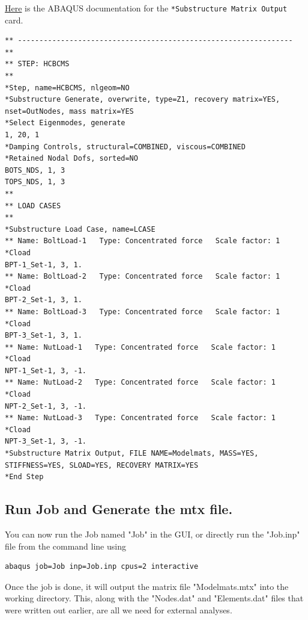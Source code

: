 \documentclass[11pt]{article}
\begin{document}
\begin{enumerate}
\href{https://classes.engineering.wustl.edu/2009/spring/mase5513/abaqus/docs/v6.6/books/key/default.htm?startat=ch18abk43.html}{Here} is the ABAQUS documentation for the \texttt{*Substructure Matrix Output} card.
\begin{verbatim}
** ----------------------------------------------------------------
** 
** STEP: HCBCMS
** 
*Step, name=HCBCMS, nlgeom=NO
*Substructure Generate, overwrite, type=Z1, recovery matrix=YES, nset=OutNodes, mass matrix=YES
*Select Eigenmodes, generate
1, 20, 1
*Damping Controls, structural=COMBINED, viscous=COMBINED
*Retained Nodal Dofs, sorted=NO
BOTS_NDS, 1, 3
TOPS_NDS, 1, 3
** 
** LOAD CASES
** 
*Substructure Load Case, name=LCASE
** Name: BoltLoad-1   Type: Concentrated force   Scale factor: 1
*Cload
BPT-1_Set-1, 3, 1.
** Name: BoltLoad-2   Type: Concentrated force   Scale factor: 1
*Cload
BPT-2_Set-1, 3, 1.
** Name: BoltLoad-3   Type: Concentrated force   Scale factor: 1
*Cload
BPT-3_Set-1, 3, 1.
** Name: NutLoad-1   Type: Concentrated force   Scale factor: 1
*Cload
NPT-1_Set-1, 3, -1.
** Name: NutLoad-2   Type: Concentrated force   Scale factor: 1
*Cload
NPT-2_Set-1, 3, -1.
** Name: NutLoad-3   Type: Concentrated force   Scale factor: 1
*Cload
NPT-3_Set-1, 3, -1.
*Substructure Matrix Output, FILE NAME=Modelmats, MASS=YES, STIFFNESS=YES, SLOAD=YES, RECOVERY MATRIX=YES
*End Step
\end{verbatim}
\end{enumerate}
\subsection{Run Job and Generate the mtx file.}
\label{sec:orgc4924d1}
You can now run the Job named "Job" in the GUI, or directly run the "Job.inp" file from the command line using
\begin{verbatim}
abaqus job=Job inp=Job.inp cpus=2 interactive
\end{verbatim}
Once the job is done, it will output the matrix file "Modelmats.mtx" into the working directory.
This, along with the "Nodes.dat" and "Elements.dat" files that were written out earlier, are all we need for external analyses.
\end{document}
